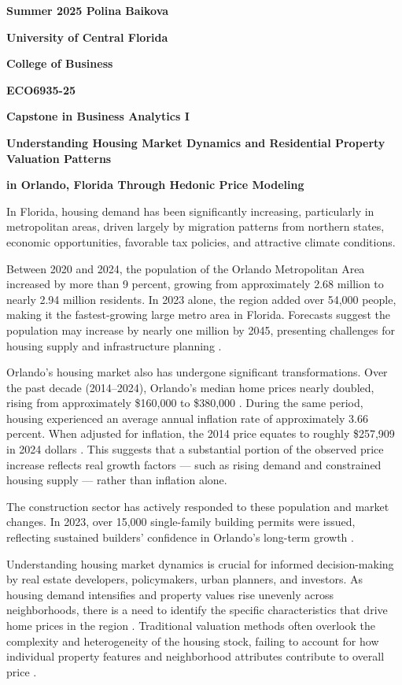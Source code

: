 \documentclass[11pt]{article}
\begin{document}
	
	\pagestyle{empty}
	{\noindent\bf Summer 2025 \hfill Polina Baikova}
	\vskip 16pt
	\centerline{\bf University of Central Florida}
	\centerline{\bf College of Business}
	\vskip 16pt
	\centerline{\bf ECO6935-25}
	\centerline{\bf Capstone in Business Analytics I}
	\vskip 10pt
	\centerline{\bf Understanding Housing Market Dynamics and Residential Property Valuation Patterns }
	\centerline{\bf in Orlando, Florida Through Hedonic Price Modeling}
	\vskip 22pt
	\noindent
	
In Florida, housing demand has been significantly increasing, particularly in metropolitan areas, driven largely by migration patterns from northern states, economic opportunities, favorable tax policies, and attractive climate conditions.

Between 2020 and 2024, the population of the Orlando Metropolitan Area increased by more than 9 percent, growing from approximately 2.68 million to nearly 2.94 million residents. In 2023 alone, the region added over 54,000 people, making it the fastest-growing large metro area in Florida. Forecasts suggest the population may increase by nearly one million by 2045, presenting challenges for housing supply and infrastructure planning \cite{bebr2023}.

Orlando’s housing market also has undergone significant transformations. Over the past decade (2014–2024), Orlando's median home prices nearly doubled, rising from approximately \$160,000 to \$380,000 \cite{orlando2024}. During the same period, housing experienced an average annual inflation rate of approximately 3.66 percent. When adjusted for inflation, the 2014 price equates to roughly \$257,909 in 2024 dollars \cite{bls2024}. This suggests that a substantial portion of the observed price increase reflects real growth factors — such as rising demand and constrained housing supply — rather than inflation alone.

The construction sector has actively responded to these population and market changes. In 2023, over 15,000 single-family building permits were issued, reflecting sustained builders' confidence in Orlando’s long-term growth \cite{hud2024}.

Understanding housing market dynamics is crucial for informed decision-making by real estate developers, policymakers, urban planners, and investors. As housing demand intensifies and property values rise unevenly across neighborhoods, there is a need to identify the specific characteristics that drive home prices in the region \cite{gyourko2013}. Traditional valuation methods often overlook the complexity and heterogeneity of the housing stock, failing to account for how individual property features and neighborhood attributes contribute to overall price \cite{malpezzi2003}.
\end{document}
